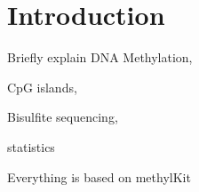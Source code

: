\section{Introduction}

Briefly explain DNA Methylation, 

CpG islands, 

Bisulfite sequencing, 

statistics

Everything is based on methylKit \cite{23034086}
  
  
  
  
  
  
  